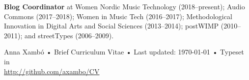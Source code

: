 \documentclass[10pt, a4paper]{article}
\begin{document}
{\textbf{Blog Coordinator}} at Women Nordic Music Technology (2018--present); Audio Commons (2017--2018); Women in Music Tech (2016--2017); Methodological Innovation in Digital Arts and Social Sciences (2013--2014); postWIMP (2010--2011); and streetTypes (2006--2009).\\


\begin{center}
{\scriptsize  Anna Xambó •\- Brief Curriculum Vitae •\- Last updated: \today\- •\- %
Typeset in \href{http://nitens.org/taraborelli/cvtex}{
\XeTeX }\\
\href{http://github.com/axambo/CV}{http://github.com/axambo/CV}}
\end{center}
\end{document}

